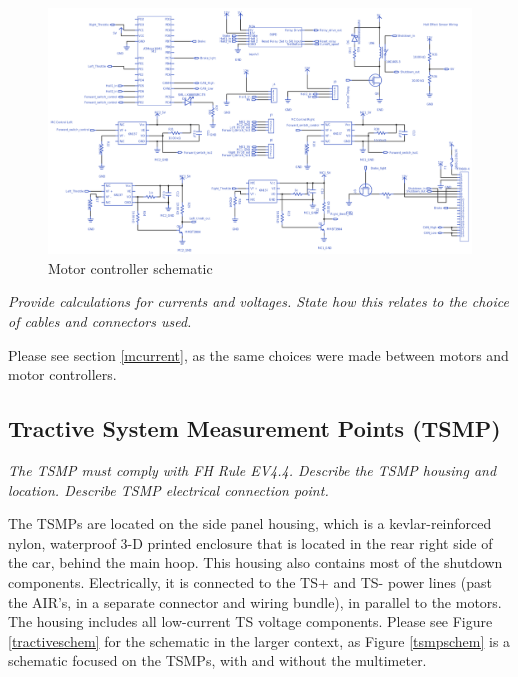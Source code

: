 \documentclass{article}
\begin{document}
    \begin{figure}[H]
     \centering
     \includegraphics[width = 0.7 \textwidth]{MCCschem}
     \caption{Motor controller schematic}
     \label{mccschem}
    \end{figure}

    \textit{Provide calculations for currents and voltages. State how this relates to the choice of cables and connectors used.}

    Please see section \ref{mcurrent}, as the same choices were made between motors and motor controllers.

    \subsection{Tractive System Measurement Points (TSMP)}

    \textit{The TSMP must comply with FH Rule EV4.4. Describe the TSMP housing and location. Describe TSMP electrical connection point.}

    The TSMPs are located on the side panel housing, which is a kevlar-reinforced nylon, waterproof 3-D printed enclosure that is located in the rear right side of the car, behind the main hoop. This housing also contains most of the shutdown components. Electrically, it is connected to the TS+ and TS- power lines (past the AIR's, in a separate connector and wiring bundle), in parallel to the motors. The housing includes all low-current TS voltage components. Please see Figure \ref{tractiveschem} for the schematic in the larger context, as Figure \ref{tsmpschem} is a schematic focused on the TSMPs, with and without the multimeter.
\end{document}
